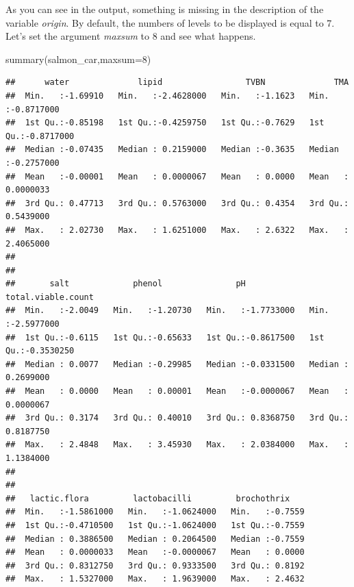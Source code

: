 \documentclass[
]{book}
\newenvironment{Shaded}{\begin{snugshade}}{\end{snugshade}}
\newcommand{\AttributeTok}[1]{\textcolor[rgb]{0.77,0.63,0.00}{#1}}
\newcommand{\DecValTok}[1]{\textcolor[rgb]{0.00,0.00,0.81}{#1}}
\newcommand{\FunctionTok}[1]{\textcolor[rgb]{0.00,0.00,0.00}{#1}}
\newcommand{\NormalTok}[1]{#1}
\begin{document}
As you can see in the output, something is missing in the description of the variable \emph{origin}. By default, the numbers of levels to be displayed is equal to 7. Let's set the argument \emph{maxsum} to 8 and see what happens.

\begin{Shaded}
\begin{Highlighting}[]
\FunctionTok{summary}\NormalTok{(salmon\_car,}\AttributeTok{maxsum=}\DecValTok{8}\NormalTok{)}
\end{Highlighting}
\end{Shaded}

\begin{verbatim}
##      water              lipid                 TVBN              TMA            
##  Min.   :-1.69910   Min.   :-2.4628000   Min.   :-1.1623   Min.   :-0.8717000  
##  1st Qu.:-0.85198   1st Qu.:-0.4259750   1st Qu.:-0.7629   1st Qu.:-0.8717000  
##  Median :-0.07435   Median : 0.2159000   Median :-0.3635   Median :-0.2757000  
##  Mean   :-0.00001   Mean   : 0.0000067   Mean   : 0.0000   Mean   : 0.0000033  
##  3rd Qu.: 0.47713   3rd Qu.: 0.5763000   3rd Qu.: 0.4354   3rd Qu.: 0.5439000  
##  Max.   : 2.02730   Max.   : 1.6251000   Max.   : 2.6322   Max.   : 2.4065000  
##                                                                                
##                                                                                
##       salt             phenol               pH             total.viable.count  
##  Min.   :-2.0049   Min.   :-1.20730   Min.   :-1.7733000   Min.   :-2.5977000  
##  1st Qu.:-0.6115   1st Qu.:-0.65633   1st Qu.:-0.8617500   1st Qu.:-0.3530250  
##  Median : 0.0077   Median :-0.29985   Median :-0.0331500   Median : 0.2699000  
##  Mean   : 0.0000   Mean   : 0.00001   Mean   :-0.0000067   Mean   : 0.0000067  
##  3rd Qu.: 0.3174   3rd Qu.: 0.40010   3rd Qu.: 0.8368750   3rd Qu.: 0.8187750  
##  Max.   : 2.4848   Max.   : 3.45930   Max.   : 2.0384000   Max.   : 1.1384000  
##                                                                                
##                                                                                
##   lactic.flora         lactobacilli         brochothrix     
##  Min.   :-1.5861000   Min.   :-1.0624000   Min.   :-0.7559  
##  1st Qu.:-0.4710500   1st Qu.:-1.0624000   1st Qu.:-0.7559  
##  Median : 0.3886500   Median : 0.2064500   Median :-0.7559  
##  Mean   : 0.0000033   Mean   :-0.0000067   Mean   : 0.0000  
##  3rd Qu.: 0.8312750   3rd Qu.: 0.9333500   3rd Qu.: 0.8192  
##  Max.   : 1.5327000   Max.   : 1.9639000   Max.   : 2.4632  

\end{verbatim}
\end{document}
